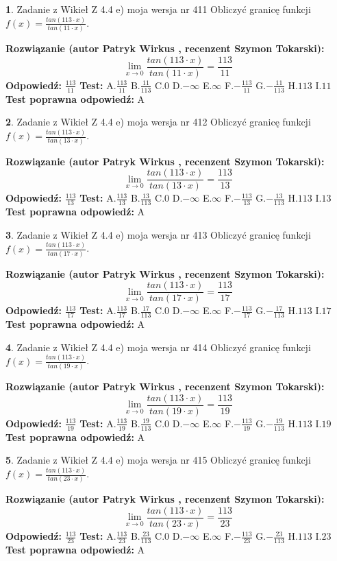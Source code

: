\documentclass[12pt, a4paper]{article}
\theoremstyle{definition} %
\newtheorem{zad}{}
\newcommand{\zadStart}[1]{\begin{zad}#1\newline}
\newcommand{\zadStop}{\end{zad}}
\newcommand{\rozwStart}[2]{\noindent \textbf{Rozwiązanie (autor #1 , recenzent #2): }\newline}
\newcommand{\rozwStop}{\newline}
\newcommand{\odpStart}{\noindent \textbf{Odpowiedź:}\newline}
\newcommand{\odpStop}{\newline}
\newcommand{\testStart}{\noindent \textbf{Test:}\newline}
\newcommand{\testStop}{\newline}
\newcommand{\kluczStart}{\noindent \textbf{Test poprawna odpowiedź:}\newline}
\newcommand{\kluczStop}{\newline}
\begin{document}
\zadStart{Zadanie z Wikieł Z 4.4 e) moja wersja nr 411}
Obliczyć granicę funkcji $f(x)=\frac{tan(113\cdot x)}{tan(11\cdot x)}$.
\zadStop
\rozwStart{Patryk Wirkus}{Szymon Tokarski}
$$\lim\limits_{x\to 0}\frac{tan(113\cdot x)}{tan(11\cdot x)}=
\frac{113}{11}$$
\rozwStop
\odpStart
$\frac{113}{11}$
\odpStop
\testStart
A.$\frac{113}{11}$
B.$\frac{11}{113}$
C.$0$
D.$-\infty$
E.$\infty$
F.$-\frac{113}{11}$
G.$-\frac{11}{113}$
H.$113$
I.$11$
\testStop
\kluczStart
A
\kluczStop



\zadStart{Zadanie z Wikieł Z 4.4 e) moja wersja nr 412}
Obliczyć granicę funkcji $f(x)=\frac{tan(113\cdot x)}{tan(13\cdot x)}$.
\zadStop
\rozwStart{Patryk Wirkus}{Szymon Tokarski}
$$\lim\limits_{x\to 0}\frac{tan(113\cdot x)}{tan(13\cdot x)}=
\frac{113}{13}$$
\rozwStop
\odpStart
$\frac{113}{13}$
\odpStop
\testStart
A.$\frac{113}{13}$
B.$\frac{13}{113}$
C.$0$
D.$-\infty$
E.$\infty$
F.$-\frac{113}{13}$
G.$-\frac{13}{113}$
H.$113$
I.$13$
\testStop
\kluczStart
A
\kluczStop



\zadStart{Zadanie z Wikieł Z 4.4 e) moja wersja nr 413}
Obliczyć granicę funkcji $f(x)=\frac{tan(113\cdot x)}{tan(17\cdot x)}$.
\zadStop
\rozwStart{Patryk Wirkus}{Szymon Tokarski}
$$\lim\limits_{x\to 0}\frac{tan(113\cdot x)}{tan(17\cdot x)}=
\frac{113}{17}$$
\rozwStop
\odpStart
$\frac{113}{17}$
\odpStop
\testStart
A.$\frac{113}{17}$
B.$\frac{17}{113}$
C.$0$
D.$-\infty$
E.$\infty$
F.$-\frac{113}{17}$
G.$-\frac{17}{113}$
H.$113$
I.$17$
\testStop
\kluczStart
A
\kluczStop



\zadStart{Zadanie z Wikieł Z 4.4 e) moja wersja nr 414}
Obliczyć granicę funkcji $f(x)=\frac{tan(113\cdot x)}{tan(19\cdot x)}$.
\zadStop
\rozwStart{Patryk Wirkus}{Szymon Tokarski}
$$\lim\limits_{x\to 0}\frac{tan(113\cdot x)}{tan(19\cdot x)}=
\frac{113}{19}$$
\rozwStop
\odpStart
$\frac{113}{19}$
\odpStop
\testStart
A.$\frac{113}{19}$
B.$\frac{19}{113}$
C.$0$
D.$-\infty$
E.$\infty$
F.$-\frac{113}{19}$
G.$-\frac{19}{113}$
H.$113$
I.$19$
\testStop
\kluczStart
A
\kluczStop



\zadStart{Zadanie z Wikieł Z 4.4 e) moja wersja nr 415}
Obliczyć granicę funkcji $f(x)=\frac{tan(113\cdot x)}{tan(23\cdot x)}$.
\zadStop
\rozwStart{Patryk Wirkus}{Szymon Tokarski}
$$\lim\limits_{x\to 0}\frac{tan(113\cdot x)}{tan(23\cdot x)}=
\frac{113}{23}$$
\rozwStop
\odpStart
$\frac{113}{23}$
\odpStop
\testStart
A.$\frac{113}{23}$
B.$\frac{23}{113}$
C.$0$
D.$-\infty$
E.$\infty$
F.$-\frac{113}{23}$
G.$-\frac{23}{113}$
H.$113$
I.$23$
\testStop
\kluczStart
A
\kluczStop
\end{document}
